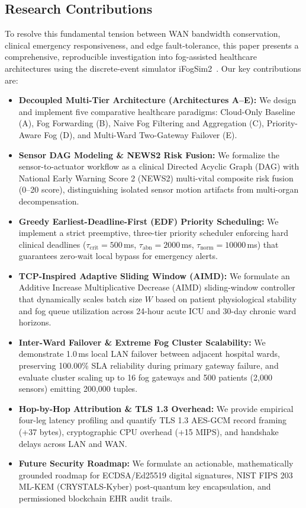 \documentclass[conference]{IEEEtran}
\begin{document}
\subsection{Research Contributions}
To resolve this fundamental tension between WAN bandwidth conservation, clinical emergency responsiveness, and edge fault-tolerance, this paper presents a comprehensive, reproducible investigation into fog-assisted healthcare architectures using the discrete-event simulator iFogSim2~\cite{Mahmud2022}. Our key contributions are:
\begin{itemize}
    \item \textbf{Decoupled Multi-Tier Architecture (Architectures A--E):} We design and implement five comparative healthcare paradigms: Cloud-Only Baseline (A), Fog Forwarding (B), Naive Fog Filtering and Aggregation (C), Priority-Aware Fog (D), and Multi-Ward Two-Gateway Failover (E).
    \item \textbf{Sensor DAG Modeling \& NEWS2 Risk Fusion:} We formalize the sensor-to-actuator workflow as a clinical Directed Acyclic Graph (DAG) with National Early Warning Score 2 (NEWS2) multi-vital composite risk fusion (0--20 score), distinguishing isolated sensor motion artifacts from multi-organ decompensation.
    \item \textbf{Greedy Earliest-Deadline-First (EDF) Priority Scheduling:} We implement a strict preemptive, three-tier priority scheduler enforcing hard clinical deadlines ($\tau_{\text{crit}}=500$\,ms, $\tau_{\text{abn}}=2000$\,ms, $\tau_{\text{norm}}=10000$\,ms) that guarantees zero-wait local bypass for emergency alerts.
    \item \textbf{TCP-Inspired Adaptive Sliding Window (AIMD):} We formulate an Additive Increase Multiplicative Decrease (AIMD) sliding-window controller that dynamically scales batch size $W$ based on patient physiological stability and fog queue utilization across 24-hour acute ICU and 30-day chronic ward horizons.
    \item \textbf{Inter-Ward Failover \& Extreme Fog Cluster Scalability:} We demonstrate 1.0\,ms local LAN failover between adjacent hospital wards, preserving 100.00\% SLA reliability during primary gateway failure, and evaluate cluster scaling up to 16 fog gateways and 500 patients (2,000 sensors) emitting 200,000 tuples.
    \item \textbf{Hop-by-Hop Attribution \& TLS 1.3 Overhead:} We provide empirical four-leg latency profiling and quantify TLS 1.3 AES-GCM record framing (+37 bytes), cryptographic CPU overhead (+15 MIPS), and handshake delays across LAN and WAN.
    \item \textbf{Future Security Roadmap:} We formulate an actionable, mathematically grounded roadmap for ECDSA/Ed25519 digital signatures, NIST FIPS 203 ML-KEM (CRYSTALS-Kyber) post-quantum key encapsulation, and permissioned blockchain EHR audit trails.
\end{itemize}
\end{document}
